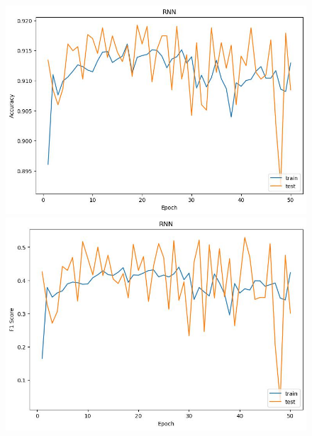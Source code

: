 \documentclass[UTF8]{article}
\begin{document}
\begin{figure}[h]
    \centering
    \begin{minipage}{.43\linewidth}
        \centering
        \includegraphics[width=\linewidth]{../figure/RNN_Accuracy.jpg}
    \end{minipage}
    \begin{minipage}{.43\linewidth}
        \centering
        \includegraphics[width=\linewidth]{../figure/RNN_F1.jpg}
    \end{minipage}


\end{figure}
\end{document}
